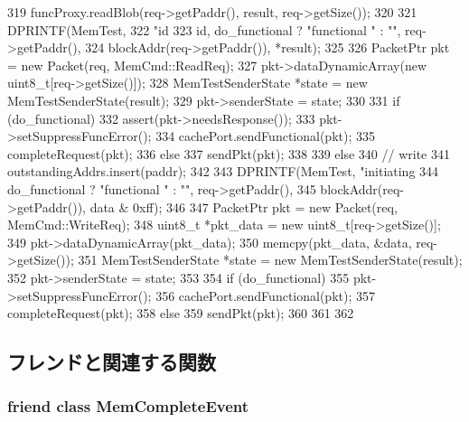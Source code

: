 \begin{DoxyCode}
{{319         funcProxy.readBlob(req->getPaddr(), result, req->getSize());
320 
321         DPRINTF(MemTest,
322                 "id %
323                 id, do_functional ? "functional " : "", req->getPaddr(),
324                 blockAddr(req->getPaddr()), *result);
325 
326         PacketPtr pkt = new Packet(req, MemCmd::ReadReq);
327         pkt->dataDynamicArray(new uint8_t[req->getSize()]);
328         MemTestSenderState *state = new MemTestSenderState(result);
329         pkt->senderState = state;
330 
331         if (do_functional) {
332             assert(pkt->needsResponse());
333             pkt->setSuppressFuncError();
334             cachePort.sendFunctional(pkt);
335             completeRequest(pkt);
336         } else {
337             sendPkt(pkt);
338         }
339     } else {
340         // write
341         outstandingAddrs.insert(paddr);
342 
343         DPRINTF(MemTest, "initiating %
344                 do_functional ? "functional " : "", req->getPaddr(),
345                 blockAddr(req->getPaddr()), data & 0xff);
346 
347         PacketPtr pkt = new Packet(req, MemCmd::WriteReq);
348         uint8_t *pkt_data = new uint8_t[req->getSize()];
349         pkt->dataDynamicArray(pkt_data);
350         memcpy(pkt_data, &data, req->getSize());
351         MemTestSenderState *state = new MemTestSenderState(result);
352         pkt->senderState = state;
353 
354         if (do_functional) {
355             pkt->setSuppressFuncError();
356             cachePort.sendFunctional(pkt);
357             completeRequest(pkt);
358         } else {
359             sendPkt(pkt);
360         }
361     }
362 }
\end{DoxyCode}


\subsection{フレンドと関連する関数}
\hypertarget{classMemTest_a24edf30be1f143e9b680a6b2e3747fbd}{
\subsubsection[{MemCompleteEvent}]{\setlength{\rightskip}{0pt plus 5cm}friend class MemCompleteEvent}}
\label{classMemTest_a24edf30be1f143e9b680a6b2e3747fbd}


